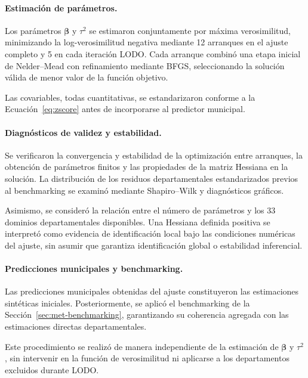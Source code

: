 \paragraph{Estimación de parámetros.}

Los parámetros $\boldsymbol{\beta}$ y $\tau^2$ se estimaron conjuntamente por máxima verosimilitud, minimizando la log-verosimilitud negativa mediante 12 arranques en el ajuste completo y 5 en cada iteración LODO. Cada arranque combinó una etapa inicial de Nelder--Mead con refinamiento mediante BFGS, seleccionando la solución válida de menor valor de la función objetivo.

Las covariables, todas cuantitativas, se estandarizaron conforme a la Ecuación~\ref{eq:zscore} antes de incorporarse al predictor municipal.

\paragraph{Diagnósticos de validez y estabilidad.}

Se verificaron la convergencia y estabilidad de la optimización entre arranques, la obtención de parámetros finitos y las propiedades de la matriz Hessiana en la solución. La distribución de los residuos departamentales estandarizados previos al benchmarking se examinó mediante Shapiro--Wilk y diagnósticos gráficos.

Asimismo, se consideró la relación entre el número de parámetros y los 33 dominios departamentales disponibles. Una Hessiana definida positiva se interpretó como evidencia de identificación local bajo las condiciones numéricas del ajuste, sin asumir que garantiza identificación global o estabilidad inferencial.

\paragraph{Predicciones municipales y benchmarking.}

Las predicciones municipales obtenidas del ajuste constituyeron las estimaciones sintéticas iniciales. Posteriormente, se aplicó el benchmarking de la Sección~\ref{sec:met-benchmarking}, garantizando su coherencia agregada con las estimaciones directas departamentales.

Este procedimiento se realizó de manera independiente de la estimación de $\boldsymbol{\beta}$ y $\tau^2$, sin intervenir en la función de verosimilitud ni aplicarse a los departamentos excluidos durante LODO.

